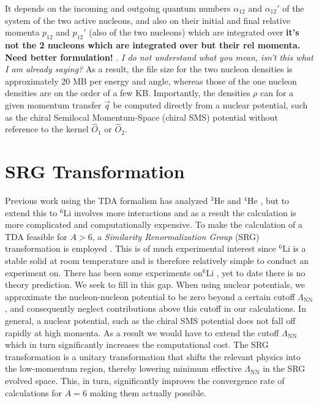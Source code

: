 \documentclass[a4paper,11pt]{article}
\newcommand{\LamNN}{\Lambda_{\mathrm{NN}}}
\newcommand{\LiS}{{}^{6} \mathrm{Li} }
\newcommand{\HeF}{{}^{4} \mathrm{He}}
\newcommand{\HeT}{{}^{3} \mathrm{He}}
\newcommand{\ques}[1]{\color{red}\textit{ #1 }\color{black}}
\newcommand{\com}[1]{\color{blue}\small\textbf{ #1 }\color{black}\normalsize}
\begin{document}
It depends on the incoming and outgoing quantum numbers
$\alpha_{12}$ and $\alpha_{12}'$ of the system of the two active nucleons, and also on their initial and final
relative momenta $p_{12}$ and $p_{12}'$ (also of the two nucleons) which are integrated over \com{it's not the 2 nucleons which are integrated over but their rel momenta. Need better formulation!}.\ques{I do not understand what you mean, isn't this what I am already saying?}
As a result, the file size for the two nucleon densities is approximately 20 MB
per energy and angle, whereas those of the one
nucleon densities are on the order of a few KB.
Importantly, the densities $\rho$ can for a given momentum transfer $\vec{q}$ be computed directly from a nuclear
potential, such as the chiral Semilocal Momentum-Space (chiral SMS) potential
\cite{Reinert2018}
without reference to the kernel $\hat{O}_1$ or $\hat{O}_{2}$.
\section{SRG Transformation}
Previous work using the TDA formalism has analyzed
$\HeT$ and $\HeF$
\cite{hammer2020, hammer4He}, but to extend this to $\LiS$ involves more interactions
and as a result the calculation is more complicated and computationally expensive.
To make the calculation of a TDA feasible for $A>6$, a
\textit{Similarity Renormalization Group} (SRG) transformation
is employed \cite{SRG, Furnstahl2013}.
This is of much experimental interest since $\LiS$ is a stable solid at room temperature and is
therefore relatively simple to conduct an experiment on.
There has been some experiments on$\LiS$ \cite{60MeV,86MeV}, yet to date there is no theory prediction.
We seek to fill in this gap.
When using nuclear potentials, we approximate the nucleon-nucleon potential to be zero
beyond a certain cutoff $\LamNN$, and consequently
neglect contributions above this cutoff in our calculations.
In general, a nuclear potential, such as the chiral SMS potential \cite{Reinert2018} does
not fall off rapidly at high momenta.
As a result we would have to
extend the cutoff $\LamNN$ which in turn significantly increases the computational cost.
The SRG transformation is a unitary transformation that
shifts the relevant physics into the low-momentum
region, thereby lowering minimum effective $\LamNN$ in the SRG evolved space.
This, in turn, significantly improves the convergence rate of calculations for $A=6$ making them actually possible.
\end{document}
